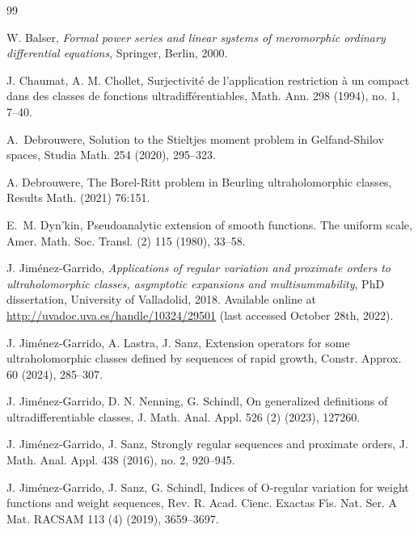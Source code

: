 \documentclass[11pt,a4paper]{article}
\theoremstyle{plain}
\theoremstyle{definition}
\numberwithin{equation}{section}
\begin{document}
\begin{thebibliography}{99}

\setlength{\itemsep}{0pt}
 W. Balser, \textit{Formal power series and linear systems of meromorphic ordinary differential equations}, Springer, Berlin, 2000.

 J. Chaumat, A. M. Chollet, Surjectivit\'e de l'application restriction \`a un compact dans des classes de fonctions ultradiff\'erentiables, Math. Ann. 298 (1994), no. 1, 7--40.

A.~Debrouwere, Solution to the {S}tieltjes moment problem in {G}elfand-{S}hilov spaces, Studia Math. 254 (2020), 295--323.

A. Debrouwere, The Borel-Ritt problem in Beurling ultraholomorphic classes, Results Math. (2021) 76:151.

E.~M. Dyn'kin, Pseudoanalytic extension of smooth functions. {T}he uniform scale,
Amer. Math. Soc. Transl. (2) 115 (1980), 33--58.

 J. Jim\'enez-Garrido, \emph{Applications of regular variation and proximate orders to ultraholomorphic classes, asymptotic expansions and multisummability}, PhD dissertation, University of Valladolid, 2018. Available online at \href{http://uvadoc.uva.es/handle/10324/29501}{http://uvadoc.uva.es/handle/10324/29501} (last accessed October 28th, 2022).

 J. Jim\'enez-Garrido, A. Lastra, J. Sanz, Extension operators for some ultraholomorphic classes defined by sequences of rapid growth, Constr. Approx. 60 (2024), 285--307. %

 J. Jim\'enez-Garrido, D. N. Nenning, G. Schindl, On generalized definitions of ultradifferentiable classes, J. Math. Anal. Appl. 526 (2) (2023), 127260.

 J. Jim\'enez-Garrido, J. Sanz, Strongly regular sequences and
proximate orders, J. Math. Anal. Appl. 438 (2016), no. 2, 920--945.

 J. Jim\'enez-Garrido, J. Sanz, G. Schindl, Indices of O-regular variation for weight functions and weight sequences, Rev. R. Acad. Cienc. Exactas F{\'\i}s. Nat. Ser. A Mat. RACSAM 113 (4) (2019), 3659--3697.


\end{thebibliography}
\end{document}
